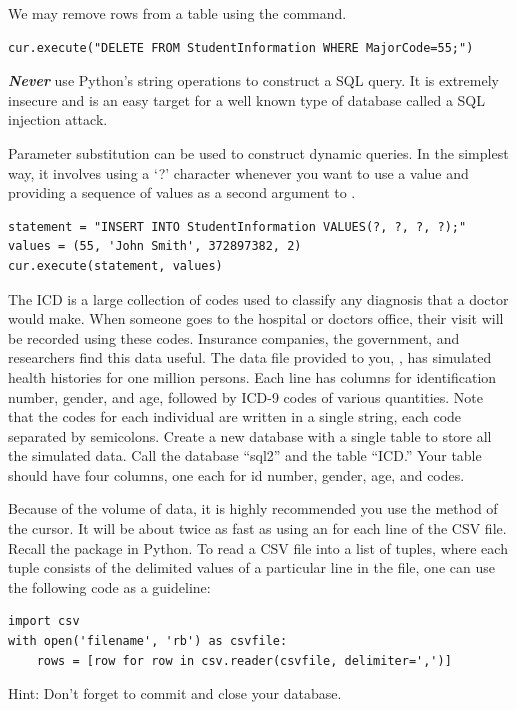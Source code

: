 We may remove rows from a table using the  command.
\begin{lstlisting}
cur.execute("DELETE FROM StudentInformation WHERE MajorCode=55;")
\end{lstlisting}

\begin{warn}
\emph{\textbf{Never}} use Python's string operations to construct a SQL query.
It is extremely insecure and is an easy target for a well known type of database called a SQL injection attack.

Parameter substitution can be used to construct dynamic queries.
In the simplest way, it involves using a `?' character whenever you want to use a value and providing a
sequence of values as a second argument to .
\begin{lstlisting}
statement = "INSERT INTO StudentInformation VALUES(?, ?, ?, ?);"
values = (55, 'John Smith', 372897382, 2)
cur.execute(statement, values)
\end{lstlisting}
\end{warn}

\begin{problem}
The ICD is a large collection of codes used to classify any diagnosis that a doctor would make.
When someone goes to the hospital or doctors office, their visit will be recorded using these codes.
Insurance companies, the government, and researchers find this data useful.
The data file provided to you, , has simulated health histories for one million persons.
Each line has columns for identification number, gender, and age, followed by ICD-9 codes of various quantities.
Note that the codes for each individual are written in a single string, each code separated by semicolons.
Create a new database with a single table to store all the simulated data.  Call the database ``sql2'' and the table ``ICD.''
Your table should have four columns, one each for id number, gender, age, and codes.

Because of the volume of data, it is highly recommended you use the  method of the cursor.
It will be about twice as fast as using an  for each line of the CSV file.
Recall the  package in Python. To read a CSV file into a list of tuples, where each tuple consists
of the delimited values of a particular line in the file, one can use the following code as a guideline:
\begin{lstlisting}
import csv
with open('filename', 'rb') as csvfile:
    rows = [row for row in csv.reader(csvfile, delimiter=',')]
\end{lstlisting}
Hint: Don't forget to commit and close your database.
\label{prob:icd9tables}
\end{problem}

